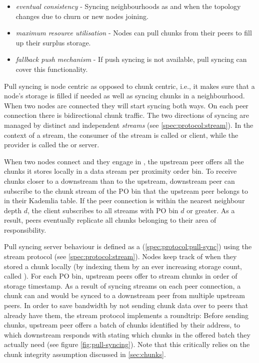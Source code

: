 \begin{itemize}
    \item \emph{eventual consistency} - Syncing neighbourhoods as and when the topology changes due to churn or new nodes joining.
    \item \emph{maximum resource utilisation} - Nodes can pull chunks from their peers to fill up their surplus storage. 
    \item \emph{fallback push mechanism} - If push syncing is not available, pull syncing can cover this functionality.  
\end{itemize}

Pull syncing is node centric as opposed to chunk centric, i.e., it makes sure that a node's storage is filled if needed as well as syncing chunks in a neighbourhood. When two nodes are connected they will start syncing both ways. On each peer connection there is bidirectional chunk traffic. The two directions of syncing are managed by distinct and independent \emph{streams} (see \ref{spec:protocol:stream}). In the context of a stream, the consumer of the stream is called  or client, while the provider is called the  or server. 

When two nodes connect and they engage in , the upstream peer offers all the chunks it stores locally in a data stream per proximity order bin. To receive chunks closer to a downstream than to the upstream, downstream peer can subscribe to the chunk stream of the PO bin that the upstream peer belongs to in their Kademlia table. If the peer connection is within the nearest neighbour depth $d$, the client subscribes to all streams with PO bin $d$ or greater. As a result, peers eventually replicate all chunks belonging to their area of responsibility.

Pull syncing server behaviour is defined as a  (\ref{spec:protocol:pull-sync}) using the stream protocol (see \ref{spec:protocol:stream}). Nodes keep track of when they stored a chunk locally (by indexing them by an ever increasing storage count, called ). For each PO bin, upstream peers offer to stream chunks in order of storage timestamp. As a result of syncing streams on each peer connection, a chunk can and would be synced to a downstream peer from multiple upstream peers. In order to save bandwidth by not sending chunk data over to peers that already have them, the stream protocol implements a roundtrip: Before sending chunks, upstream peer offers a batch of chunks identified by their address, to which downstream responds with stating which chunks in the offered batch they actually need (see figure \ref{fig:pull-syncing}). Note that this critically relies on the chunk integrity assumption discussed in \ref{sec:chunks}.


